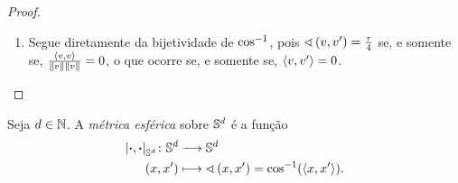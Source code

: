 \begin{proof}
\begin{enumerate}
	\item Segue diretamente da bijetividade de $\cos\inv$, pois $\ang{v}{v'} = \frac{\tau}{4}$ se, e somente se, $\frac{\inte{v}{v}}{\nor{v}\nor{v}}=0$, o que ocorre se, e somente se, $\inte{v}{v'}=0$. \qedhere
\end{enumerate}
\end{proof}


\begin{definition}
Seja $d \in \N$. A \emph{métrica esférica} sobre $\S^d$ é a função
	\begin{align*}
	\func{\dist{\var}{\var}_{\S^d}}{\S^d}{\S^d}{(x,x')}{\ang{x}{x'} = \cos\inv(\inte{x}{x'})}.
	\end{align*}
\end{definition}

